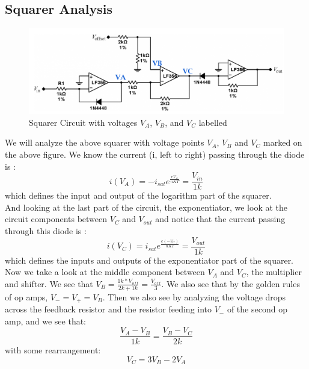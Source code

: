 \documentclass{article}
\begin{document}
    \subsection{Squarer Analysis}
    \begin{figure}[H]
        \centering
        \includegraphics[scale = 0.6]{16.png}
        \caption{Squarer Circuit \cite{lab7} with voltages $V_A$, $V_B$, and $V_C$ labelled}
        \label{fig:my_label}
    \end{figure}
    We will analyze the above squarer with voltage points $V_A$, $V_B$ and $V_C$ marked on the above figure. We know the current (i, left to right) passing through the diode is \cite{lab7}:
    \begin{equation}
        i(V_{A}) = - i_{sat}e^{\frac{eV_{A}}{nKT}} = \frac{V_{in}}{1k}
    \end{equation}
    which defines the input and output of the logarithm part of the squarer.\\\indent
    And looking at the last part of the circuit, the exponentiator, we look at the circuit components between $V_C$ and $V_{out}$ and notice that the current passing through this diode is \cite{lab7}:
    \begin{equation}
        i(V_{C}) = i_{sat}e^{\frac{e(-V_{C})}{nKT}} = \frac{V_{out}}{1k}
    \end{equation}
    which defines the inputs and outputs of the exponentiator part of the squarer. \\\indent Now we take a look at the middle component between $V_A$ and $V_C$, the multiplier and shifter. We see that $V_B = \frac{1k * V_{off}}{2k + 1k} = \frac{V_{off}}{3}$. We also see that by the golden rules of op amps, $V_- = V_+ = V_B$. Then we also see by analyzing the voltage drops across the feedback resistor and the resistor feeding into $V_-$ of the second op amp, and we see that:
    \begin{equation}
        \frac{V_A - V_B}{1k} = \frac{V_B - V_C}{2k}
    \end{equation}
    with some rearrangement:
    \begin{equation}
        V_C = 3V_B - 2V_A
    \end{equation}
\end{document}
